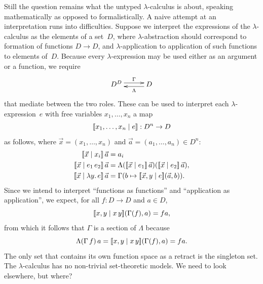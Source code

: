 Still the question remains what the untyped $\lambda$-calculus is
about, speaking mathematically as opposed to formalistically. A naive
attempt at an interpretation runs into difficulties.
%
Suppose we interpret the expressions of the $\lambda$-calculus as the elements of a set~$D$, where $\lambda$-abstraction should correspond to formation of functions $D \to D$, and $\lambda$-application to application of such functions to elements of~$D$.
%
Because every $\lambda$-expression may be used either as an argument or a function, we require
%
\begin{equation}
  \label{eq:lambda-section-retraction}
  \xymatrix{
    **[l]{D^D}
    \ar@<+0.25em>[r]^{\Gamma}
    &
    {D}
    \ar@<+0.25em>[l]^{\Lambda}
  }
\end{equation}
%
that mediate between the two roles. These can be used to interpret
each $\lambda$-expression~$e$ with free variables $x_1, \ldots, x_n$ a map
%
\begin{equation*}
  [\![x_1, \ldots, x_n \mid e]\!] : D^n \to D
\end{equation*}
%
as follows, where $\vec{x} = (x_1, \ldots, x_n)$ and $\vec{a} = (a_1, \ldots, a_n) \in D^n$:
%
\begin{equation}
  \label{eq:semantics-lambda-calculus}
  \begin{aligned}
    \sem{\vec{x} \ctx x_i} \, \vec{a} &= a_i \\
    \sem{\vec{x} \ctx e_1\, e_2} \, \vec{a} &= 
    \Lambda(\sem{\vec{x} \ctx e_1} \, \vec{a}) (\sem{\vec{x} \ctx e_2} \, \vec{a}), \\
    \sem{\vec{x} \ctx \lam{y}{e}} \, \vec{a} &= \Gamma(b \mapsto \sem{\vec{x}, y \ctx e} (\vec{a}, b)).
  \end{aligned}
\end{equation}
%
Since we intend to interpret ``functions as functions'' and ``application as application'', we expect, for all $f : D \to D$ and $a \in D$,
%
\begin{equation*}
  [\![x, y \mid x \, y]\!](\Gamma(f), a) = f a,
\end{equation*}
%
from which it follows that $\Gamma$ is a section of $\Lambda$ because
%
\begin{equation*}
  \Lambda (\Gamma \, f) \, a =
  [\![x, y \mid x \, y]\!](\Gamma(f), a) = f a.
\end{equation*}
%
The only set that contains its own function space as a retract is the singleton set. The $\lambda$-calculus has no non-trivial set-theoretic models. We need to look elsewhere, but where?

